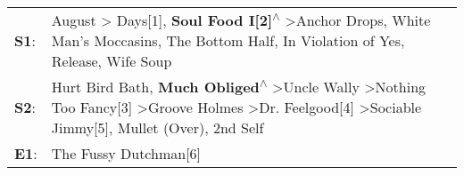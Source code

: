 \begin{supertabular}{p{0.03\textwidth}p{0.92\textwidth}}
 \textbf{S1}:  &                                                August\textsuperscript{} \textgreater {} Days[1]\textsuperscript{}, \enspace \textbf{Soul Food I[2]\textsuperscript{$\wedge$}} \textgreater \enspace Anchor Drops\textsuperscript{}, \enspace White Man's Moccasins\textsuperscript{}, \enspace The Bottom Half\textsuperscript{}, \enspace In Violation of Yes\textsuperscript{}, \enspace Release\textsuperscript{}, \enspace Wife Soup\textsuperscript{}  \enspace  \\
 \textbf{S2}:  &  Hurt Bird Bath\textsuperscript{}, \enspace \textbf{Much Obliged\textsuperscript{$\wedge$}} \textgreater \enspace Uncle Wally\textsuperscript{} \textgreater \enspace Nothing Too Fancy[3]\textsuperscript{} \textgreater \enspace Groove Holmes\textsuperscript{} \textgreater \enspace Dr. Feelgood[4]\textsuperscript{} \textgreater \enspace Sociable Jimmy[5]\textsuperscript{}, \enspace Mullet (Over)\textsuperscript{}, \enspace 2nd Self\textsuperscript{}  \enspace  \\
 \textbf{E1}:  &                                                                                                                                                                                                                                                                                                                                                                                                                             The Fussy Dutchman[6]\textsuperscript{}  \enspace  \\
\end{supertabular}

